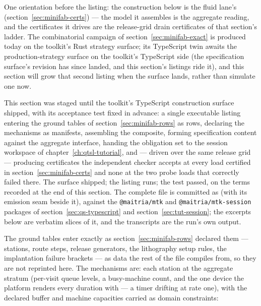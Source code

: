 One orientation before the listing: the construction below is the
fluid lane's (section~\ref{sec:minifab-certs}) --- the model it
assembles is the aggregate reading, and the certificates it drives
are the release-grid drain certificates of that section's ladder.
The combinatorial campaign of section~\ref{sec:minifab-exact} is
produced today on the toolkit's Rust strategy surface; its
TypeScript twin awaits the production-strategy surface on the
toolkit's TypeScript side (the specification surface's revision has
since landed, and this section's listings ride it), and this
section will grow that second listing when the surface lands,
rather than simulate one now.

This section was staged until the toolkit's TypeScript construction
surface shipped, with its acceptance test fixed in advance: a single
executable listing entering the ground tables of
section~\ref{sec:minifab-rows} as rows, declaring the mechanisms as
manifests, assembling the composite, forming specification content
against the aggregate interface, handing the obligation set to the
session workspace of chapter~\ref{ch:qtsl-tutorial}, and --- driven
over the same release grid --- producing certificates the
independent checker accepts at every load certified in
section~\ref{sec:minifab-certs} and none at the two probe loads that
correctly failed there. The surface shipped; the listing runs; the
test passed, on the terms recorded at the end of this section. The
complete file is committed as 
(with its emission seam  beside it), against the
\texttt{@maitria/mtk} and \texttt{@maitria/mtk-session} packages of
section~\ref{sec:qs-typescript} and
section~\ref{sec:tut-session}; the excerpts below are verbatim
slices of it, and the transcripts are the run's own output.

The ground tables enter exactly as
section~\ref{sec:minifab-rows} declared them --- stations, route
steps, release generators, the lithography setup rules, the
implantation failure brackets --- as data the rest of the file
compiles from, so they are not reprinted here. The mechanisms are:
each station at the aggregate stratum (per-visit queue levels, a
busy-machine count, and the one device the platform renders every
duration with --- a timer drifting at rate one), with the declared
buffer and machine capacities carried as domain constraints:

